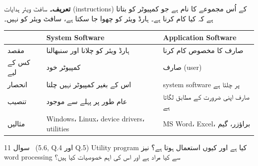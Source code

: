\begin{hal}
\textbf{تعریف۔} سافٹ ویئر ہدایات (\textenglish{instructions}) کے اُس مجموعے کا
نام ہے جو کمپیوٹر کو بتاتا ہے کہ کیا کام کرنا ہے۔ ہارڈ ویئر کو چھوا جا سکتا ہے،
سافٹ ویئر کو نہیں۔

\medskip
\begin{center}
\begin{tabular}{@{}p{2.6cm} p{5.8cm} p{5.8cm}@{}}
\toprule
 & \textbf{\textenglish{System Software}} & \textbf{\textenglish{Application Software}} \\
\midrule
مقصد & ہارڈ ویئر کو چلانا اور سنبھالنا & صارف کا مخصوص کام کرنا \\
کس کے لیے & کمپیوٹر خود & صارف (\textenglish{user}) \\
انحصار & اس کے بغیر کمپیوٹر نہیں چلتا & \textenglish{system software} پر چلتا ہے \\
تنصیب & عام طور پر پہلے سے موجود & صارف اپنی ضرورت کے مطابق لگاتا ہے \\
مثالیں & \textenglish{Windows}، \textenglish{Linux}، \textenglish{device drivers}، \textenglish{utilities} & \textenglish{MS Word}، \textenglish{Excel}، براؤزر، گیم \\
\bottomrule
\end{tabular}
\end{center}

\end{hal}

\begin{sawal}{سوال \textenglish{11} \ \textnormal{\small(\textenglish{5.6, Q.4} اور \textenglish{Q.5})}}
\textenglish{Utility program} کیا ہے اور کیوں استعمال ہوتا ہے؟ نیز
\textenglish{word processing} سے کیا مراد ہے اور اس کی اہم خصوصیات کیا ہیں؟
\end{sawal}

